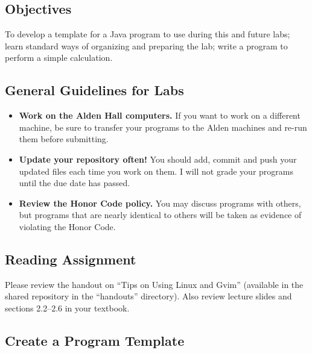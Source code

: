 



\subsection*{Objectives}

To develop a template for a Java program to use during this and future labs; learn standard ways of organizing and
preparing the lab; write a program to perform a simple calculation.

\subsection*{General Guidelines for Labs}

\begin{itemize}
\item
{\bf Work on the Alden Hall computers.} If you want to work on a different
machine, be sure to transfer your programs to the Alden
machines and re-run them before submitting.
\item
{\bf Update your repository often!} You should add, commit 
and push your updated files each time you work on them.  I will not grade 
your programs until the due date has passed.
\item
{\bf Review the Honor Code policy.} You
may discuss programs with others, but programs that are nearly identical
to others will be taken as evidence of violating the Honor Code.
\end{itemize}

\subsection*{Reading Assignment}

Please review the handout on ``Tips on Using Linux and Gvim'' (available in the shared repository in the ``handouts''
  directory).  Also review lecture slides and sections 2.2--2.6 in your textbook.

\subsection*{Create a Program Template}

